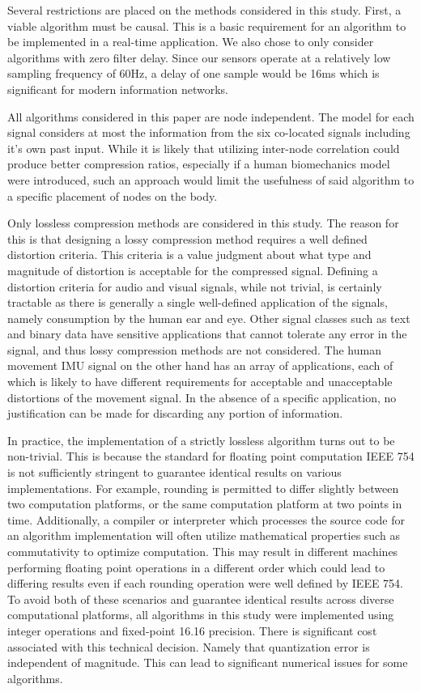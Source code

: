 \documentclass[journal]{IEEEtran}
\begin{document}
Several restrictions are placed on the methods considered in this study. First, a viable algorithm must be causal. This is a basic requirement for an algorithm to be implemented in a real-time application. We also chose to only consider algorithms with zero filter delay. Since our sensors operate at a relatively low sampling frequency of 60Hz, a delay of one sample would be 16ms which is significant for modern information networks.

All algorithms considered in this paper are node independent. The model for each signal considers at most the information from the six co-located signals including it's own past input. While it is likely that utilizing inter-node correlation could produce better compression ratios, especially if a human biomechanics model were introduced, such an approach would limit the usefulness of said algorithm to a specific placement of nodes on the body.

Only lossless compression methods are considered in this study. The reason for this is that designing a lossy compression method requires a well defined distortion criteria\cite{Sayood2006}. This criteria is a value judgment about what type and magnitude of distortion is acceptable for the compressed signal. Defining a distortion criteria for audio and visual signals, while not trivial, is certainly tractable as there is generally a single well-defined application of the signals, namely consumption by the human ear and eye\cite{Limb1979}\cite{Painter2000}. Other signal classes such as text and binary data have sensitive applications that cannot tolerate any error in the signal, and thus lossy compression methods are not considered. The human movement IMU signal on the other hand has an array of applications, each of which is likely to have different requirements for acceptable and unacceptable distortions of the movement signal. In the absence of a specific application, no justification can be made for discarding any portion of information.

In practice, the implementation of a strictly lossless algorithm turns out to be non-trivial. This is because the standard for floating point computation IEEE 754 \cite{Society2008} is not sufficiently stringent to guarantee identical results on various implementations\cite{Monniaux2008}\cite{Goldberg1991}. For example, rounding is permitted to differ slightly between two computation platforms, or the same computation platform at two points in time. Additionally, a compiler or interpreter which processes the source code for an algorithm implementation will often utilize mathematical properties such as commutativity to optimize computation. This may result in different machines performing floating point operations in a different order which could lead to differing results even if each rounding operation were well defined by IEEE 754. To avoid both of these scenarios and guarantee identical results across diverse computational platforms, all algorithms in this study were implemented using integer operations and fixed-point 16.16 precision. There is significant cost associated with this technical decision. Namely that quantization error is independent of magnitude. This can lead to significant numerical issues for some algorithms.
\end{document}
